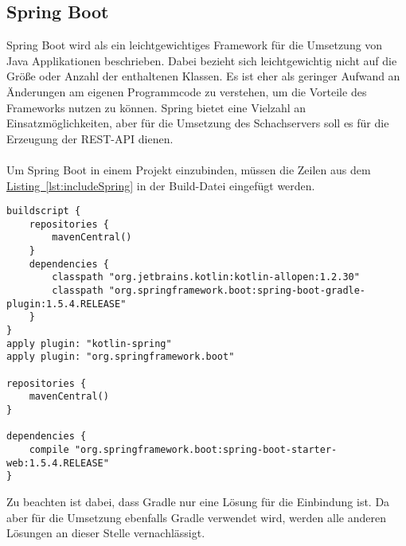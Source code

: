 \subsection{Spring Boot}\label{sec:bibspring}
Spring Boot wird als ein leichtgewichtiges Framework für die Umsetzung von Java Applikationen beschrieben. Dabei bezieht sich leichtgewichtig nicht auf die Größe oder Anzahl der enthaltenen Klassen. Es ist eher als geringer Aufwand an Änderungen am eigenen Programmcode zu verstehen, um die Vorteile des Frameworks nutzen zu können. \cite{proSpring5} Spring bietet eine Vielzahl an Einsatzmöglichkeiten, aber für die Umsetzung des Schachservers soll es für die Erzeugung der \gls{REST}-\gls{API} dienen.\\
\\
Um Spring Boot in einem Projekt einzubinden, müssen die Zeilen aus dem \hyperref[lst:includeSpring]{Listing~\ref{lst:includeSpring}} in der Build-Datei  eingefügt werden.
\begin{lstlisting}[style=lstStyleFramed, language=Gradle, caption={Einbindung des Spring Framework mittels Gradle}, label=lst:includeSpring, float]
buildscript {
	repositories {
		mavenCentral()
	}
	dependencies {
		classpath "org.jetbrains.kotlin:kotlin-allopen:1.2.30"
		classpath "org.springframework.boot:spring-boot-gradle-plugin:1.5.4.RELEASE"
	}
}
apply plugin: "kotlin-spring"
apply plugin: "org.springframework.boot"

repositories {
	mavenCentral()
}

dependencies {
	compile "org.springframework.boot:spring-boot-starter-web:1.5.4.RELEASE"
}
\end{lstlisting}
Zu beachten ist dabei, dass Gradle nur eine Lösung für die Einbindung ist. Da aber für die Umsetzung ebenfalls Gradle verwendet wird, werden alle anderen Lösungen an dieser Stelle vernachlässigt.\\
\\ 
